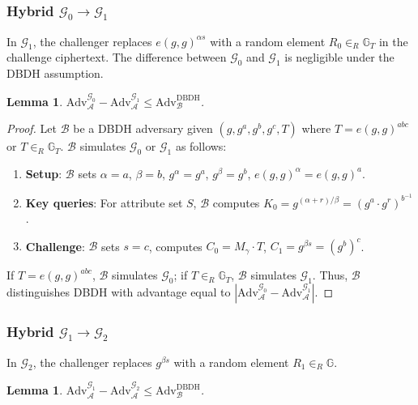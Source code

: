 \documentclass[lettersize,journal]{IEEEtran}
\newtheorem{lemma}[theorem]{Lemma}
\begin{document}
\subsubsection{Hybrid $\mathcal{G}_0 \rightarrow \mathcal{G}_1$}

In $\mathcal{G}_1$, the challenger replaces $e(g,g)^{\alpha s}$ with a random element $R_0 \in_R \mathbb{G}_T$ in the challenge ciphertext. The difference between $\mathcal{G}_0$ and $\mathcal{G}_1$ is negligible under the DBDH assumption.

\begin{lemma}
\label{lem:g0_g1}
$\text{Adv}_{\mathcal{A}}^{\mathcal{G}_0} - \text{Adv}_{\mathcal{A}}^{\mathcal{G}_1} \leq \text{Adv}_{\mathcal{B}}^{\text{DBDH}}$.
\end{lemma}

\begin{proof}
Let $\mathcal{B}$ be a DBDH adversary given $(g, g^a, g^b, g^c, T)$ where $T = e(g,g)^{abc}$ or $T \in_R \mathbb{G}_T$. $\mathcal{B}$ simulates $\mathcal{G}_0$ or $\mathcal{G}_1$ as follows:

\begin{enumerate}
    \item \textbf{Setup}: $\mathcal{B}$ sets $\alpha = a$, $\beta = b$, $g^\alpha = g^a$, $g^\beta = g^b$, $e(g,g)^\alpha = e(g,g)^a$.
    \item \textbf{Key queries}: For attribute set $S$, $\mathcal{B}$ computes $K_0 = g^{(\alpha+r)/\beta} = (g^a \cdot g^r)^{b^{-1}}$.
    \item \textbf{Challenge}: $\mathcal{B}$ sets $s = c$, computes $C_0 = M_\gamma \cdot T$, $C_1 = g^{\beta s} = (g^b)^c$.
\end{enumerate}

If $T = e(g,g)^{abc}$, $\mathcal{B}$ simulates $\mathcal{G}_0$; if $T \in_R \mathbb{G}_T$, $\mathcal{B}$ simulates $\mathcal{G}_1$. Thus, $\mathcal{B}$ distinguishes DBDH with advantage equal to $|\text{Adv}_{\mathcal{A}}^{\mathcal{G}_0} - \text{Adv}_{\mathcal{A}}^{\mathcal{G}_1}|$.
\end{proof}

\subsubsection{Hybrid $\mathcal{G}_1 \rightarrow \mathcal{G}_2$}

In $\mathcal{G}_2$, the challenger replaces $g^{\beta s}$ with a random element $R_1 \in_R \mathbb{G}$.

\begin{lemma}
\label{lem:g1_g2}
$\text{Adv}_{\mathcal{A}}^{\mathcal{G}_1} - \text{Adv}_{\mathcal{A}}^{\mathcal{G}_2} \leq \text{Adv}_{\mathcal{B}}^{\text{DBDH}}$.
\end{lemma}
\end{document}
